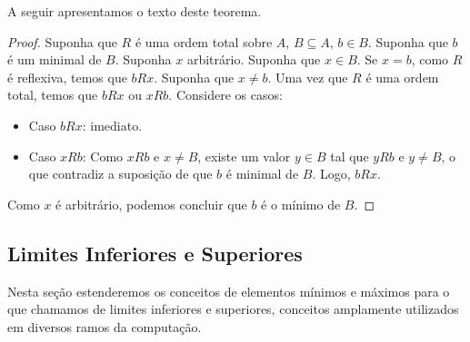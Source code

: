 A seguir apresentamos o texto deste teorema.

\begin{proof}
Suponha que $R$ é uma ordem total sobre $A$, $B\subseteq A$, $b \in
B$. Suponha que $b$ é um minimal de $B$. Suponha $x$
arbitrário. Suponha que $x\in B$. Se $x = b$, como $R$ é reflexiva,
temos que $bRx$. Suponha que $x\neq b$. Uma vez que $R$ é uma ordem
total, temos que $bRx$ ou $xRb$. Considere os casos:
\begin{itemize}
  \item Caso $bRx$: imediato.
  \item Caso $xRb$: Como $xRb$ e $x\neq B$, existe um valor $y \in B$
    tal que $yRb$ e $y\neq B$, o que contradiz a suposição de que $b$
    é minimal de $B$. Logo, $bRx$.
\end{itemize}
Como $x$ é arbitrário, podemos concluir que $b$ é o mínimo de $B$.
\end{proof}

\subsection{Limites Inferiores e Superiores}

Nesta seção estenderemos os conceitos de elementos mínimos e máximos
para o que chamamos de limites inferiores e superiores, conceitos
amplamente utilizados em diversos ramos da computação.

\begin{Definition}
\end{Definition}